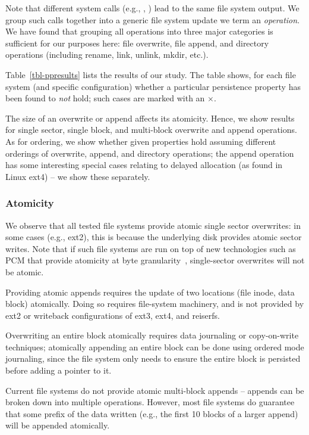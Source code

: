 Note that different system calls (e.g., , )
lead to the same file system output. We group such calls together into a
generic file system update we term an \textit{operation}. We have found that
grouping all operations into three major categories is sufficient for our
purposes here: file overwrite, file append, and directory operations
(including rename, link, unlink, mkdir, etc.).  



Table~\ref{tbl-ppresults} lists the results of our study. The table shows, for
each file system (and specific configuration) whether a particular persistence
property has been found to {\em not} hold; such cases are marked with an
$\times$. 

The size of an overwrite or append affects its atomicity. Hence, we show results
for single sector, single block, and multi-block overwrite and append
operations. As for ordering, we show whether given properties hold
assuming different orderings of overwrite, append, and directory
operations; the append operation has some interesting special cases
relating to delayed allocation (as found in Linux ext4) -- we show these
separately. 

\subsubsection{Atomicity}

We observe that all tested file systems provide atomic single sector
overwrites: in some cases (e.g., ext2), this is because the underlying disk
 provides atomic sector writes. Note that if such file systems are run on
top of new technologies such as PCM that provide atomicity at byte
granularity~\cite{condit2009better}, single-sector overwrites will not be
atomic.

Providing atomic appends requires the update of two locations (file inode,
data block) atomically. Doing so requires file-system machinery, and is not
provided by ext2 or writeback configurations of ext3, ext4, and reiserfs.

Overwriting an entire block atomically requires data journaling or
copy-on-write techniques; atomically appending an entire block can be done using
ordered mode journaling, since the file system only needs to ensure the entire
block is persisted before adding a pointer to it.

Current file systems do not provide atomic multi-block appends -- appends can
be broken down into multiple operations. However, most file systems do
guarantee that some prefix of the data written (e.g., the first 10 blocks of a
larger append) will be appended atomically.

